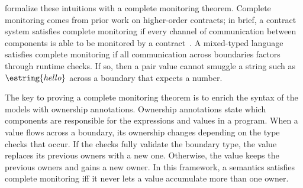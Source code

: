\citet{gfd-oopsla-2019} formalize these intuitions with a complete
 monitoring theorem.
Complete monitoring comes from prior work on higher-order contracts;
 in brief, a contract system satisfies complete monitoring if every channel
 of communication between components is able to be monitored
 by a contract~\cite{dtf-esop-2012}.
A mixed-typed language satisfies complete monitoring if all communication
 across boundaries factors through runtime checks.
If so, then a pair value cannot smuggle a string such as $\estring{hello}$
 across a boundary that expects a number.

The key to proving a complete monitoring theorem is to enrich the syntax of
 the models with ownership annotations.
Ownership annotations state which components are responsible for the
 expressions and values in a program.
When a value flows across a boundary, its ownership changes depending on
 the type checks that occur.
If the checks fully validate the boundary type, the value replaces its previous
 owners with a new one.
Otherwise, the value keeps the previous owners and gains a new owner.
In this framework, a semantics satisfies complete monitoring iff it never
 lets a value accumulate more than one owner.




